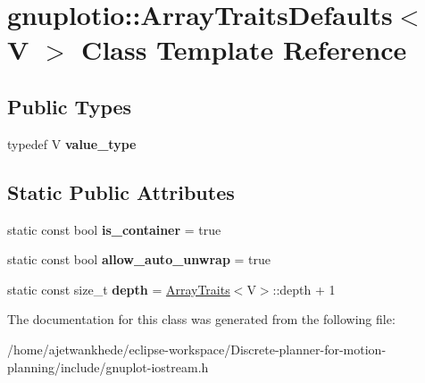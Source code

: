 \hypertarget{classgnuplotio_1_1ArrayTraitsDefaults}{}\section{gnuplotio\+:\+:Array\+Traits\+Defaults$<$ V $>$ Class Template Reference}
\label{classgnuplotio_1_1ArrayTraitsDefaults}
\subsection*{Public Types}
\begin{DoxyCompactItemize}
\item 
\mbox{\label{classgnuplotio_1_1ArrayTraitsDefaults_ad7a9e8d19419fabe2ab9cc1b76c9965b}} 
typedef V {\bfseries value\+\_\+type}
\end{DoxyCompactItemize}
\subsection*{Static Public Attributes}
\begin{DoxyCompactItemize}
\item 
\mbox{\label{classgnuplotio_1_1ArrayTraitsDefaults_a57bab5bf3617f0ee66fdd4dcb751aa21}} 
static const bool {\bfseries is\+\_\+container} = true
\item 
\mbox{\label{classgnuplotio_1_1ArrayTraitsDefaults_ac8d430cba6ceefc6f52706455f12a0e8}} 
static const bool {\bfseries allow\+\_\+auto\+\_\+unwrap} = true
\item 
\mbox{\label{classgnuplotio_1_1ArrayTraitsDefaults_ac51367f5da9096249b162af1496e36ab}} 
static const size\+\_\+t {\bfseries depth} = \mbox{\hyperlink{classgnuplotio_1_1ArrayTraits}{Array\+Traits}}$<$V$>$\+::depth + 1
\end{DoxyCompactItemize}


The documentation for this class was generated from the following file\+:\begin{DoxyCompactItemize}
\item 
/home/ajetwankhede/eclipse-\/workspace/\+Discrete-\/planner-\/for-\/motion-\/planning/include/gnuplot-\/iostream.\+h\end{DoxyCompactItemize}
